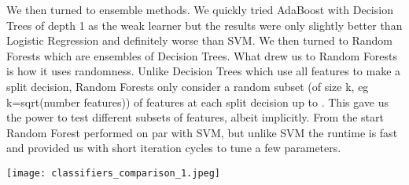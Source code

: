 \documentclass[twoside,11pt]{homework}
\begin{document}
We then turned to ensemble methods. We quickly tried AdaBoost with Decision 
Trees of depth 1 as the weak learner but the results were only slightly better than 
Logistic Regression and definitely worse than SVM. We then turned to Random 
Forests which are ensembles of Decision Trees. What drew us to Random Forests is 
how it uses randomness. Unlike Decision Trees which use all features to make a split 
decision, Random Forests only consider a random subset (of size k, eg 
k=sqrt(number features)) of features at each split decision up to . This gave us the 
power to test different subsets of features, albeit implicitly. From the start Random 
Forest performed on par with SVM, but unlike SVM the runtime is fast and provided 
us with short iteration cycles to tune a few parameters.

\texttt{[image: classifiers\_comparison\_1.jpeg]}
\end{document}
